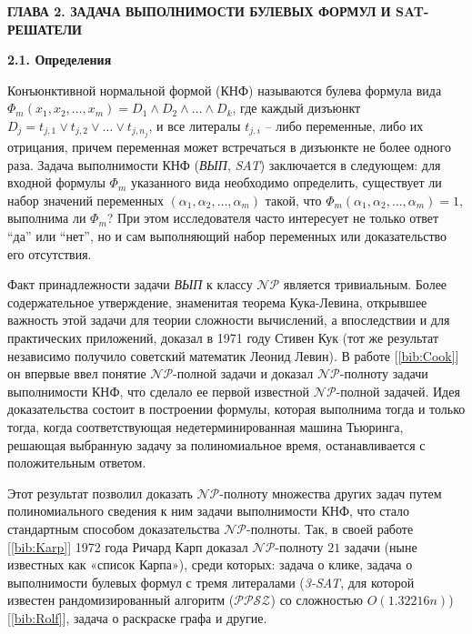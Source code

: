 \newpage
\begin{center}
\noindent\textbf{ГЛАВА 2. ЗАДАЧА ВЫПОЛНИМОСТИ БУЛЕВЫХ ФОРМУЛ И SAT-РЕШАТЕЛИ}\label{chapters:2}
\vspace{1.5mm}
\end{center}

\vspace{5pt}
\textbf{2.1. Определения}\label{chapters:2.1}
\vspace{5pt}

Конъюнктивной нормальной формой (КНФ) называются булева формула вида 
$\Phi_m \left( x_1, x_2, \dots, x_m \right) = D_1 \land D_2 \land \dots \land D_k$,
где каждый дизъюнкт $D_j=t_{j,1} \lor t_{j,2} \lor \dots \lor t_{j,n_j}$, 
и все литералы $t_{j,i}$ -- либо переменные, либо их отрицания,
причем переменная может встречаться в дизъюнкте не более одного раза. 
Задача выполнимости КНФ (\textit{ВЫП}, \textit{SAT}) заключается в следующем: для входной формулы $\Phi_m$ указанного вида 
необходимо определить, существует ли набор значений переменных $\left( \alpha_1, \alpha_2, \dots, \alpha_m \right)$ такой,
что $\Phi_m \left( \alpha_1, \alpha_2, \dots, \alpha_m \right) = 1$, выполнима ли $\Phi_m$? 
При этом исследователя часто интересует не только ответ \enquote{да} или \enquote{нет}, но и сам выполняющий набор переменных или доказательство его отсутствия.

Факт принадлежности задачи \textit{ВЫП} к классу $\mathcal{NP}$ является тривиальным. Более содержательное утверждение, 
знаменитая теорема Кука-Левина, открывшее важность этой задачи для теории сложности вычислений, 
а впоследствии и для практических приложений, доказал в 1971 году Стивен Кук (тот же результат независимо получило советский математик Леонид Левин). В работе [\ref{bib:Cook}] он впервые ввел понятие $\mathcal{NP}$-полной задачи и доказал $\mathcal{NP}$-полноту 
задачи выполнимости КНФ, что сделало ее первой известной $\mathcal{NP}$-полной задачей. 
Идея доказательства состоит в построении формулы, которая выполнима тогда и только тогда, когда соответствующая 
недетерминированная машина Тьюринга, решающая выбранную задачу за полиномиальное время, останавливается с положительным ответом.

Этот результат позволил доказать $\mathcal{NP}$-полноту множества других задач путем полиномиального сведения к ним задачи выполнимости КНФ, что стало стандартным способом доказательства $\mathcal{NP}$-полноты. 
Так, в своей работе [\ref{bib:Karp}] 1972 года Ричард Карп доказал $\mathcal{NP}$-полноту $21$ задачи (ныне известных как «список Карпа»), 
среди которых: задача о клике, задача о выполнимости булевых формул с тремя литералами (\textit{3-SAT}, 
для которой известен рандомизированный алгоритм ($\mathcal{PPSZ}$) со сложностью $O \left( 1.32216n \right)$) [\ref{bib:Rolf}], 
задача о раскраске графа и другие.

